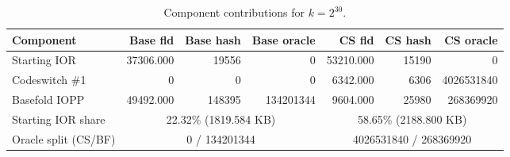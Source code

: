 \begin{table}[htbp]
\centering
\caption{Component contributions for $k=2^{30}$.}
\begin{tabular}{lrrrrrr}
\toprule
Component & Base fld & Base hash & Base oracle & CS fld & CS hash & CS oracle \\
\midrule
Starting IOR & 37306.000 & 19556 & 0 & 53210.000 & 15190 & 0\\
Codeswitch \#1 & 0 & 0 & 0 & 6342.000 & 6306 & 4026531840\\
Basefold IOPP & 49492.000 & 148395 & 134201344 & 9604.000 & 25980 & 268369920\\
Starting IOR share & \multicolumn{3}{c}{22.32\% (1819.584 KB)} & \multicolumn{3}{c}{58.65\% (2188.800 KB)}\\
Oracle split (CS/BF) & \multicolumn{3}{c}{0 / 134201344} & \multicolumn{3}{c}{4026531840 / 268369920}\\
\bottomrule
\end{tabular}
\end{table}
